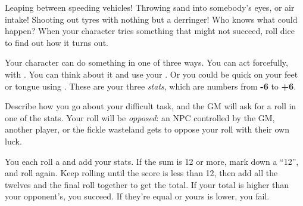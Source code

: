 
Leaping between speeding vehicles! Throwing sand into somebody's eyes, or air intake! Shooting out tyres with nothing but a derringer! Who knows what could happen? When your character tries something that might not succeed, roll dice to find out how it turns out.

Your character can do something in one of three ways. You can act forcefully, with . You can think about it and use your . Or you could be quick on your feet or tongue using . These are your three \emph{stats}, which are numbers from \textbf{-6} to \textbf{+6}.

Describe how you go about your difficult task, and the GM will ask for a roll in one of the stats. Your roll will be \emph{opposed}: an NPC controlled by the GM, another player, or the fickle wasteland gets to oppose your roll with their own luck.

You each roll a  and add your stats. If the sum is 12 or more, mark down a ``12'', and roll again. Keep rolling until the score is less than 12, then add all the twelves and the final roll together to get the total. If your total is higher than your opponent's, you succeed. If they're equal or yours is lower, you fail.
